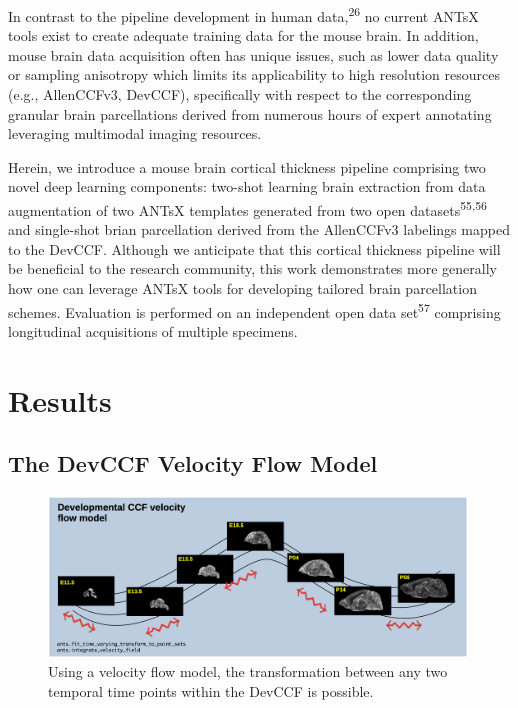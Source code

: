 \documentclass[
  12pt,
]{article}
\begin{document}
In contrast to the pipeline development in human
data,\textsuperscript{26} no current ANTsX tools exist to create
adequate training data for the mouse brain. In addition, mouse brain
data acquisition often has unique issues, such as lower data quality or
sampling anisotropy which limits its applicability to high resolution
resources (e.g., AllenCCFv3, DevCCF), specifically with respect to the
corresponding granular brain parcellations derived from numerous hours
of expert annotating leveraging multimodal imaging resources.

Herein, we introduce a mouse brain cortical thickness pipeline
comprising two novel deep learning components: two-shot learning brain
extraction from data augmentation of two ANTsX templates generated from
two open datasets\textsuperscript{55,56} and single-shot brian
parcellation derived from the AllenCCFv3 labelings mapped to the DevCCF.
Although we anticipate that this cortical thickness pipeline will be
beneficial to the research community, this work demonstrates more
generally how one can leverage ANTsX tools for developing tailored brain
parcellation schemes. Evaluation is performed on an independent open
data set\textsuperscript{57} comprising longitudinal acquisitions of
multiple specimens.

\clearpage
\newpage

\hypertarget{results}{%
\section{Results}\label{results}}

\hypertarget{the-devccf-velocity-flow-model-1}{%
\subsection{The DevCCF Velocity Flow
Model}\label{the-devccf-velocity-flow-model-1}}

\begin{figure}
\centering
\includegraphics[width=0.99\textwidth]{Figures/lowerLeftPanel.png}
\caption{Using a velocity flow model, the transformation between any two
temporal time points within the DevCCF is possible.}
\label{fig:devccfvelocity}
\end{figure}
\end{document}

